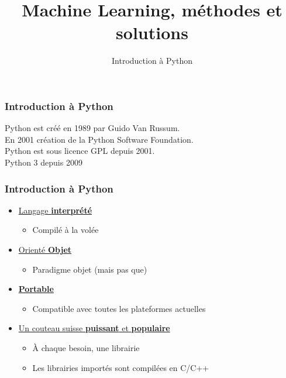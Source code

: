 \documentclass{formation}
\title{Machine Learning, méthodes et solutions}
\subtitle{Introduction à Python}
\begin{document}
\maketitle

\begin{frame}
  \frametitle{Introduction à Python}
  Python est créé en 1989 par Guido Van Russum. \\
  En 2001 création de la Python Software Foundation. \\
  Python est sous licence GPL depuis 2001. \\
  Python 3 depuis 2009
\end{frame}

\begin{frame}
  \frametitle{Introduction à Python}
  \begin{itemize}
  \item \underline{Langage \textbf{interprété}}
    \begin{itemize}
    \item Compilé à la volée
    \end{itemize}
  \item \underline{Orienté \textbf{Objet}}
    \begin{itemize}
    \item Paradigme objet (mais pas que)
    \end{itemize}
  \item \underline{\textbf{Portable}}
    \begin{itemize}
    \item Compatible  avec toutes les plateformes actuelles
    \end{itemize}
  \item \underline{Un couteau suisse \textbf{puissant} et \textbf{populaire}}
    \begin{itemize}
    \item À chaque besoin, une librairie
    \item Les librairies importés sont compilées en C/C++
    \end{itemize}
  \end{itemize}
\end{frame}
\end{document}
